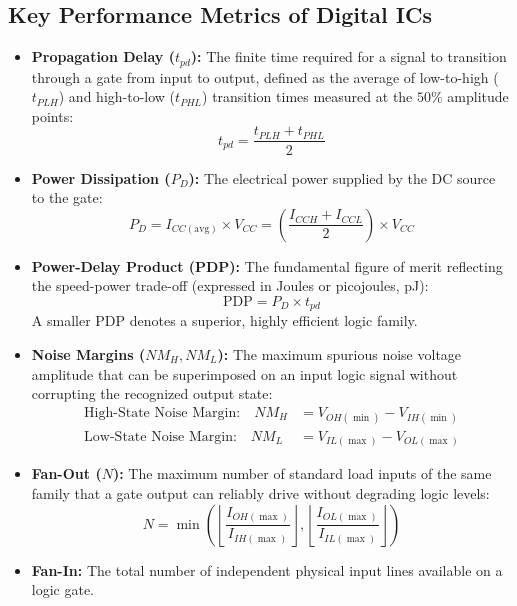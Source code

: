 \documentclass[12pt,a4paper]{article}
\begin{document}
\subsection{Key Performance Metrics of Digital ICs}
\begin{tcolorbox}[defbox, title={\textbf{Core Figures of Merit for Logic Families}}, title after break={\textbf{Core Figures of Merit for Logic Families (contd.)}}]
\begin{itemize}[leftmargin=*, itemsep=4pt]
  \item \textbf{Propagation Delay ($t_{pd}$):} The finite time required for a signal to transition through a gate from input to output, defined as the average of low-to-high ($t_{PLH}$) and high-to-low ($t_{PHL}$) transition times measured at the $50\%$ amplitude points:
  \begin{equation}
    t_{pd} = \frac{t_{PLH} + t_{PHL}}{2}
  \end{equation}
  \item \textbf{Power Dissipation ($P_D$):} The electrical power supplied by the DC source to the gate:
  \begin{equation}
    P_D = I_{CC(\text{avg})} \times V_{CC} = \left(\frac{I_{CCH} + I_{CCL}}{2}\right) \times V_{CC}
  \end{equation}
  \item \textbf{Power-Delay Product (PDP):} The fundamental figure of merit reflecting the speed-power trade-off (expressed in Joules or picojoules, pJ):
  \begin{equation}
    \text{PDP} = P_D \times t_{pd}
  \end{equation}
  A smaller PDP denotes a superior, highly efficient logic family.

  \item \textbf{Noise Margins ($NM_H, NM_L$):} The maximum spurious noise voltage amplitude that can be superimposed on an input logic signal without corrupting the recognized output state:
  \begin{align}
    \text{High-State Noise Margin:} \quad NM_H &= V_{OH(\min)} - V_{IH(\min)} \\
    \text{Low-State Noise Margin:} \quad NM_L &= V_{IL(\max)} - V_{OL(\max)}
  \end{align}

  \pagebreak

  \item \textbf{Fan-Out ($N$):} The maximum number of standard load inputs of the same family that a gate output can reliably drive without degrading logic levels:
  \begin{equation}
    N = \min\left( \left\lfloor\frac{I_{OH(\max)}}{I_{IH(\max)}}\right\rfloor, \left\lfloor\frac{I_{OL(\max)}}{I_{IL(\max)}}\right\rfloor \right)
  \end{equation}
  \item \textbf{Fan-In:} The total number of independent physical input lines available on a logic gate.
\end{itemize}
\end{tcolorbox}
\end{document}
